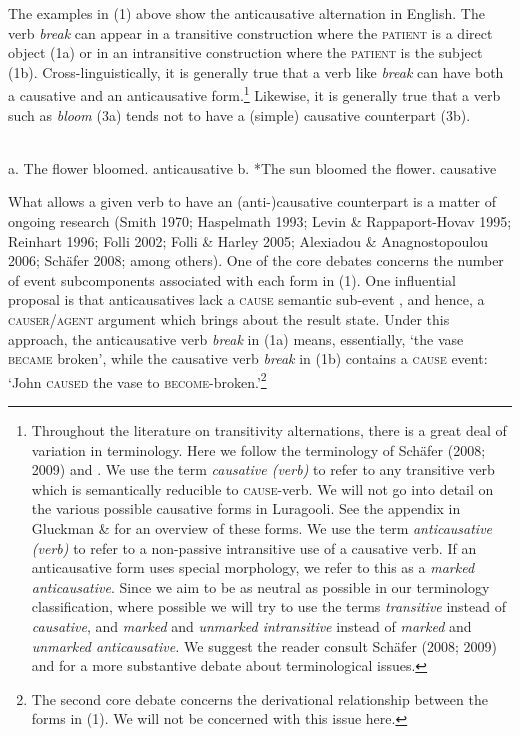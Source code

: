 \documentclass[output=paper]{langsci/langscibook}
\begin{document}
The examples in (1) above show the anticausative alternation in English. The verb \textit{break} can appear in a transitive construction where the \textsc{patient} is a direct object (1a) or in an intransitive construction where the \textsc{patient} is the subject (1b). Cross-linguistically, it is generally true that a verb like \textit{break} can have both a causative and an anticausative form.\footnote{ Throughout the literature on transitivity alternations, there is a great deal of variation in terminology. Here we follow the terminology of Schäfer (2008; 2009) and \citet{AlexiadouEtAl2015}. We use the term \textit{causative (verb)} to refer to any transitive verb which is semantically reducible to \textsc{cause}-verb. We will not go into detail on the various possible causative forms in Luragooli. See the appendix in Gluckman \& \citet{Bowler2015} for an overview of these forms. We use the term \textit{anticausative (verb)} to refer to a non-passive intransitive use of a causative verb. If an anticausative form uses special morphology, we refer to this as a \textit{marked anticausative}. Since we aim to be as neutral as possible in our terminology classification, where possible we will try to use the terms \textit{transitive} instead of \textit{causative}, and \textit{marked} and \textit{unmarked intransitive }instead of \textit{marked }and \textit{unmarked anticausative. }We suggest the reader consult Schäfer (2008; 2009) and \citet{AlexiadouEtAl2015} for a more substantive debate about terminological issues.} Likewise, it is generally true that a verb such as \textit{bloom} (3a) tends not to have a (simple) causative counterpart (3b).

\ea\label{exx:}
\ea
{}\\
 a.  The flower bloomed.        anticausative
\ex
 b.  *The sun bloomed the flower.      causative
 \z
 \z
 
What allows a given verb to have an (anti-)causative counterpart is a matter of ongoing research (Smith 1970; Haspelmath 1993; Levin \& Rappaport-Hovav 1995; Reinhart 1996; Folli 2002; Folli \& Harley 2005; Alexiadou \& Anagnostopoulou 2006; Schäfer 2008; among others). One of the core debates concerns the number of event subcomponents associated with each form in (1). One influential proposal is that anticausatives lack a \textsc{cause} semantic sub-event \citep{Haspelmath1993}, and hence, a \textsc{causer/agent} argument which brings about the result state. Under this approach, the anticausative verb \textit{break} in (1a) means, essentially, ‘the vase \textsc{became} broken’, while the causative verb \textit{break} in (1b) contains a \textsc{cause} event: ‘John \textsc{caused} the vase to \textsc{become}-broken.’\footnote{The second core debate concerns the derivational relationship between the forms in (1). We will not be concerned with this issue here.}
\end{document}
